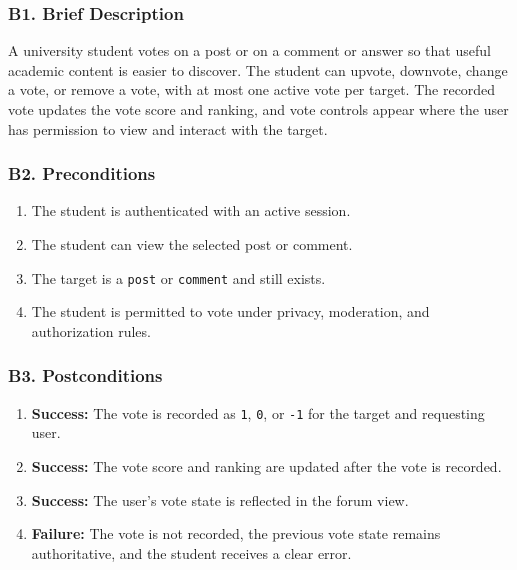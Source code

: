 \documentclass[12pt]{article}
\begin{document}
\hypertarget{sec:b1-brief-description}{}
\subsubsection*{B1. Brief Description}
\par\medskip

A university student votes on a post or on a comment or answer so that useful academic content is easier to discover. The student can upvote, downvote, change a vote, or remove a vote, with at most one active vote per target. The recorded vote updates the vote score and ranking, and vote controls appear where the user has permission to view and interact with the target.
\par\medskip

\hypertarget{sec:b2-preconditions}{}
\subsubsection*{B2. Preconditions}
\par\medskip

\begin{enumerate}
\item The student is authenticated with an active session.
\item The student can view the selected post or comment.
\item The target is a \texttt{post} or \texttt{comment} and still exists.
\item The student is permitted to vote under privacy, moderation, and authorization rules.
\end{enumerate}
\par\medskip

\hypertarget{sec:b3-postconditions}{}
\subsubsection*{B3. Postconditions}
\par\medskip

\begin{enumerate}
\item \textbf{Success:} The vote is recorded as \texttt{1}, \texttt{0}, or \texttt{-1} for the target and requesting user.
\item \textbf{Success:} The vote score and ranking are updated after the vote is recorded.
\item \textbf{Success:} The user's vote state is reflected in the forum view.
\item \textbf{Failure:} The vote is not recorded, the previous vote state remains authoritative, and the student receives a clear error.
\end{enumerate}
\par\medskip
\end{document}
